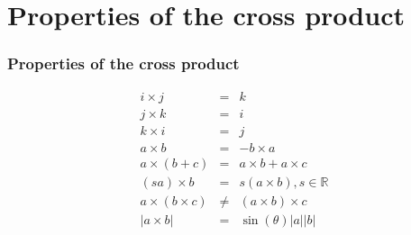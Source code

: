 \documentclass[]{beamer}
\newcommand{\sect}[1]{
\section{#1}
\begin{frame}[fragile]\frametitle{#1}
}
\begin{document}
\sect{Properties of the cross product}
\begin{eqnarray*}
  i \times j &=& k\\
  j \times k &=& i\\
  k \times i &=& j\\
  a \times b &=& -b\times a\\
  a\times (b+c) &=& a\times b + a \times c\\
  (sa) \times b &=& s(a \times b), s\in \mathbb{R}\\
a\times (b \times c) & \not =& (a\times b)\times c\\
|a\times b| &=& \sin(\theta)|a||b|
\end{eqnarray*}
\end{frame}
\end{document}
